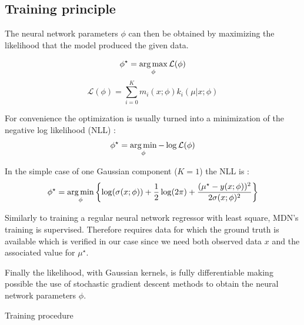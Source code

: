 \subsection{Training principle} %
\label{sub:training_principle}

The neural network parameters $\phi$ can then be obtained by maximizing the likelihood that the model produced the given data.

\begin{equation}
    \phi^\star = \operatorname*{arg\,max}_\phi \mathcal L (\phi)
\end{equation}
\begin{equation}
    \mathcal L (\phi) = \sum_{i=0}^K m_i(x ; \phi) k_i(\mu | x ; \phi)
\end{equation}


For convenience the optimization is usually turned into a minimization of the negative log likelihood (NLL) :
\begin{equation}
    \phi^\star = \operatorname*{arg\,min}_\phi - \log \mathcal L (\phi)
\end{equation}

In the simple case of one Gaussian component ($K=1$) the NLL is :
\begin{equation}
    \phi^\star = \operatorname*{arg\,min}_\phi \left\{ \log(\sigma(x;\phi)) + \frac{1}{2}\log(2\pi) + \frac{(\mu^\star - y(x;\phi))^2}{2\sigma(x;\phi)^2} \right\}
\end{equation}

Similarly to training a regular neural network regressor with least square, MDN's training is supervised.
Therefore requires data for which the ground truth is available which is verified in our case since we need both observed data $x$ and the associated value for  $\mu^\star$.

Finally the likelihood, with Gaussian kernels, is fully differentiable making possible the use of stochastic gradient descent methods to obtain the neural network parameters $\phi$.


\begin{algorithm}[H]
 \caption{Training procedure}
\end{algorithm}








